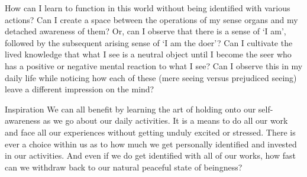
\newpage
\begin{mananam}{} 
\mananamtext How can I learn to function in this world without being identified with various actions? Can I create a space between the operations of my sense organs and my detached awareness of them? Or, can I observe that there is a sense of ‘I am’, followed by the subsequent arising sense of ‘I am the doer’? 
Can I cultivate the lived knowledge that what I see is a neutral object until I become the seer who has a positive or negative mental reaction to what I see? Can I observe this in my daily life while noticing how each of these (mere seeing versus prejudiced seeing) leave a different impression on the mind? 
\end{mananam}
\WritingHand{}
\begin{inspiration}{\mananamfont Inspiration}
\mananamtext We can all benefit by learning the art of holding onto our self-awareness as we go about our daily activities. It is a means to do all our work and face all our experiences without getting unduly excited or stressed. There is ever a choice within us as to how much we get personally identified and invested in our activities. And even if we do get identified with all of our works, how fast can we withdraw back to our natural peaceful state of beingness?
\end{inspiration}
\newpage



